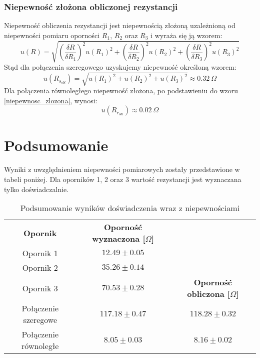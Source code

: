 \documentclass[a4paper,12pts]{article}
\begin{document}
	\subsubsection{Niepewność złożona obliczonej rezystancji}
	Niepewność obliczenia rezystancji jest niepewnością złożoną uzależnioną od niepewności pomiaru oporności $R_1$, $R_2$ oraz $R_3$ i wyraża się ją wzorem:
	\begin{equation}
		u(R) = \sqrt{\left( \frac{\delta R}{\delta R_1} \right)^2 u(R_1)^2 + \left( \frac{\delta R}{\delta R_2} \right)^2 u(R_2)^2 + \left( \frac{\delta R}{\delta R_3} \right)^2 u(R_3)^2}
		\label{niepewnosc_zlozona}
	\end{equation}
	Stąd dla połączenia szeregowego uzyskujemy niepewność określoną wzorem:
	\begin{equation}
		u(R_{s_{obl}}) = \sqrt{u(R_1)^2 + u(R_2)^2 + u(R_3)^2} \approx 0.32~\Omega
	\end{equation}
	Dla połączenia równoległego niepewność złożona, po podstawieniu do wzoru \ref{niepewnosc_zlozona}, wynosi:
	\begin{equation}
		u(R_{r_{obl}}) \approx 0.02~\Omega
	\end{equation}

	\section{Podsumowanie}
	Wyniki z uwzględnieniem niepewności pomiarowych zostały przedstawione w tabeli poniżej. Dla oporników 1, 2 oraz 3 wartość rezystancji jest wyznaczana tylko doświadczalnie.
	\begin{table}[!h]
		\centering
		\begin{tabular}{| c | c | c |}
			\cline{1-2}
			\textbf{Opornik} & \textbf{Oporność wyznaczona [$\Omega$]} \\ \cline{1-2}
			Opornik 1 & $12.49 \pm 0.05$ \\ \cline{1-2}
			Opornik 2 & $35.26 \pm 0.14$ \\ \hline
			Opornik 3 & $70.53 \pm 0.28$ & \textbf{Oporność obliczona [$\Omega$]} \\ \hline
			Połączenie szeregowe & $117.18 \pm 0.47$ & $118.28 \pm 0.32$\\ \hline
			Połączenie równoległe & $8.05 \pm 0.03$ & $8.16 \pm 0.02$\\ \hline
		\end{tabular}
		\caption{Podsumowanie wyników doświadczenia wraz z niepewnościami}
	\end{table}

\end{document}
